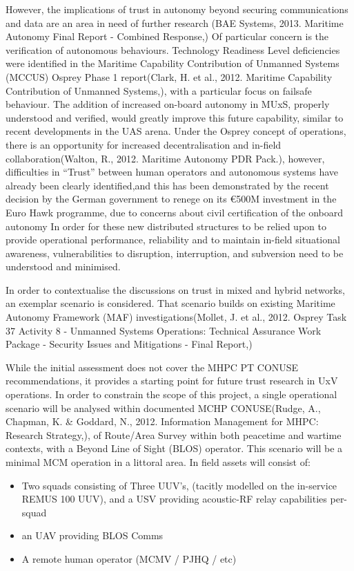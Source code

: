 However, the implications of trust in autonomy beyond securing communications and data are an area in need of further research (BAE Systems, 2013. Maritime Autonomy Final Report - Combined Response,)
Of particular concern is the verification of autonomous behaviours.
Technology Readiness Level deficiencies were identified in the Maritime Capability Contribution of Unmanned Systems (MCCUS) Osprey Phase 1 report(Clark, H. et al., 2012. Maritime Capability Contribution of Unmanned Systems,), with a particular focus on failsafe behaviour. 
The addition of increased on-board autonomy in MUxS, properly understood and verified, would greatly improve this future capability, similar to recent developments in the UAS arena\cite{Cummings2010}.
Under the Osprey concept of operations, there is an opportunity for increased decentralisation and in-field collaboration(Walton, R., 2012. Maritime Autonomy PDR Pack.), however, difficulties in “Trust” between human operators and autonomous systems have already been clearly identified\cite{Chen2011b},and this has been demonstrated by the recent decision by the German government to renege on its €500M investment in the Euro Hawk programme, due to concerns about civil certification of the onboard autonomy\cite{Mehta2013}
In order for these new distributed structures to be relied upon to provide operational performance, reliability and to maintain in-field situational awareness, vulnerabilities to disruption, interruption, and subversion need to be understood and minimised.

In order to contextualise the discussions on trust in mixed and hybrid networks, an exemplar scenario is considered.
That scenario builds on existing Maritime Autonomy Framework (MAF) investigations(Mollet, J. et al., 2012. Osprey Task 37 Activity 8 - Unmanned Systems Operations: Technical Assurance Work Package - Security Issues and Mitigations - Final Report,)

While the initial assessment does not cover the MHPC PT CONUSE recommendations, it provides a starting point for future trust research in UxV operations.
In order to constrain the scope of this project, a single operational scenario will be analysed within documented MCHP CONUSE(Rudge, A., Chapman, K. \& Goddard, N., 2012. Information Management for MHPC: Research Strategy,), of Route/Area Survey within both peacetime and wartime contexts, with a Beyond Line of Sight (BLOS) operator.
This scenario will be a minimal MCM operation in a littoral area.
In field assets will consist of:
\begin{itemize}
  \item Two squads consisting of Three UUV’s, (tacitly modelled on the in-service REMUS 100 UUV), and a USV providing acoustic-RF relay capabilities per-squad
  \item	an UAV providing BLOS Comms
  \item	A remote human operator (MCMV / PJHQ / etc)
\end{itemize}

